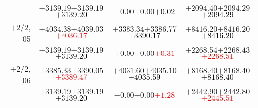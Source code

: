 \documentclass[compress]{beamer}
\begin{document}
\begin{frame}
{\begin{tabular}{r | c | c | c}
           & $+3139.19$\hspace{0.1 cm}$+3139.19$\hspace{0.1 cm}\textcolor{black}{$+3139.20$} & $-0.00$\hspace{0.1 cm}$+0.00$\hspace{0.1 cm}\textcolor{black}{$+0.02$} & $+2094.40$\hspace{0.1 cm}$+2094.29$\hspace{0.1 cm}\textcolor{black}{$+2094.29$} \\
$+$2/2, 05 & $+4034.38$\hspace{0.1 cm}$+4039.03$\hspace{0.1 cm}\textcolor{red}{$+4036.17$} & $+3383.34$\hspace{0.1 cm}$+3386.77$\hspace{0.1 cm}\textcolor{black}{$+3390.17$} & $+8416.20$\hspace{0.1 cm}$+8416.20$\hspace{0.1 cm}\textcolor{black}{$+8416.20$} \\
           & $+3139.19$\hspace{0.1 cm}$+3139.19$\hspace{0.1 cm}\textcolor{black}{$+3139.20$} & $+0.00$\hspace{0.1 cm}$+0.00$\hspace{0.1 cm}\textcolor{red}{$+0.31$} & $+2268.54$\hspace{0.1 cm}$+2268.43$\hspace{0.1 cm}\textcolor{red}{$+2268.51$} \\
$+$2/2, 06 & $+3385.33$\hspace{0.1 cm}$+3390.05$\hspace{0.1 cm}\textcolor{red}{$+3389.47$} & $+4031.60$\hspace{0.1 cm}$+4035.10$\hspace{0.1 cm}\textcolor{black}{$+4035.59$} & $+8168.40$\hspace{0.1 cm}$+8168.40$\hspace{0.1 cm}\textcolor{black}{$+8168.40$} \\
           & $+3139.19$\hspace{0.1 cm}$+3139.19$\hspace{0.1 cm}\textcolor{black}{$+3139.20$} & $+0.00$\hspace{0.1 cm}$+0.00$\hspace{0.1 cm}\textcolor{red}{$+1.28$} & $+2442.90$\hspace{0.1 cm}$+2442.80$\hspace{0.1 cm}\textcolor{red}{$+2445.51$} \\
\end{tabular}}
\end{frame}
\end{document}
